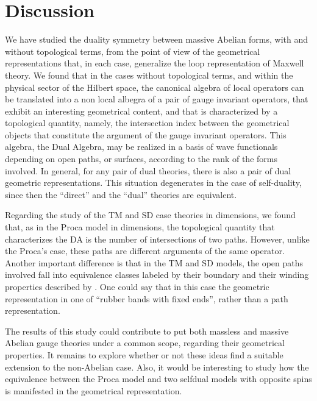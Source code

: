 \documentclass[a4paper,12pt]{article}
\begin{document}
\section{Discussion}
We have studied the duality symmetry between massive Abelian
\coordHE{}forms, with and without topological terms, from the point of
view of the geometrical representations that, in each case,
generalize the loop representation of Maxwell theory. We found
that in the cases without topological terms, and within the
physical sector of the Hilbert space, the canonical algebra of
local operators can be translated into a non local albegra of a
pair of gauge invariant operators, that exhibit an interesting
geometrical content, and that is characterized by a topological
quantity, namely, the intersection index between the geometrical
objects that constitute the argument of the gauge invariant
operators. This algebra, the Dual Algebra, may be realized in a
basis of wave functionals depending on open paths, or
\coordHE{}surfaces, according to the rank of the forms involved. In
general, for any pair of dual theories, there is also a pair of
dual geometric representations. This situation degenerates in the
case of self-duality, since then the ``direct'' and the ``dual''
theories are equivalent.

Regarding the study of the TM and SD case theories in \coordHE{}
dimensions, we found that, as in the Proca model in \coordHE{}
dimensions, the topological quantity that characterizes the DA is
the number of intersections of two paths. However, unlike the
Proca's case, these paths are different arguments of the same
operator. Another important difference is that in the TM and SD
models, the open paths involved fall into equivalence classes
labeled by their boundary \myHighlight{$\partial\gamma$}\coordHE{} and their winding
properties described by \myHighlight{$\Delta\Theta(\gamma)$}\coordHE{}. One could say
that in this case the geometric representation in one of ``rubber
bands with fixed ends'', rather than a path representation.

The results of this study could contribute to put both massless
and massive Abelian gauge theories under a common scope, regarding
their geometrical properties. It remains to explore whether or
not these ideas find a suitable extension to the non-Abelian case. Also, it 
would be interesting to study how the equivalence between the Proca model and 
two selfdual models with opposite spins is manifested in the geometrical representation. 
\end{document}
